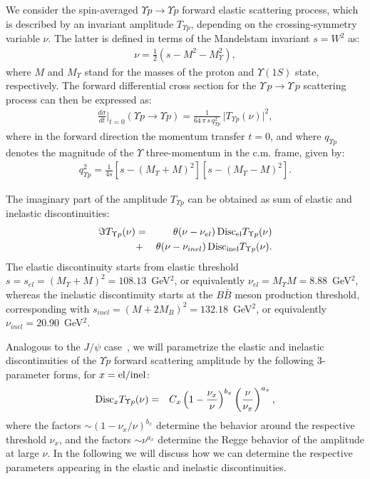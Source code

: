 \documentclass[prd,amsmath,%
twocolumn,floatfix,amssymb, preprintnumbers, linenumbers,nofootinbib, superscriptaddress]{revtex4}
\newcommand{\bea}{\begin{eqnarray}}
\newcommand{\eea}{\end{eqnarray}}
\begin{document}
We consider the spin-averaged $\Upsilon p \to \Upsilon p$ forward elastic scattering process, which is described by an invariant amplitude $T_{\Upsilon p}$, depending on the crossing-symmetry variable $\nu$. The latter is defined in terms of the Mandelstam invariant $s =W^2$ as:
\bea
\nu = \frac{1}{2} (s - M^2 - M_\Upsilon^2),
\eea
where $M$ and $M_\Upsilon$ stand for the masses of the proton and $\Upsilon(1S)$ state, respectively.  
The forward differential cross section for the $\Upsilon \, p \to \Upsilon \, p$ scattering process can then be expressed as:
\bea
\frac{d \sigma}{dt} \biggr|_{t = 0} (\Upsilon p \to \Upsilon p) = \frac{1}{64 \, \pi \, s \, q_{\Upsilon p}^2} \, \big| T_{\Upsilon p}(\nu) \big|^2,
\eea
where in the forward direction the momentum transfer $t = 0$, and where $q_{\Upsilon p}$ denotes the magnitude of the $\Upsilon$ three-momentum in the c.m. frame, given by:
 \bea 
 q_{\Upsilon p}^2  = \frac{1}{4 s} \left[ s - (M_\Upsilon + M)^2 \right] \left[ s - (M_\Upsilon - M)^2 \right].
 \eea 
 
The imaginary part of the amplitude $T_{\Upsilon p}$ can be obtained as sum of elastic and inelastic discontinuities:
\bea
\Im T_{\Upsilon p}(\nu)  &=& \theta(\nu - \nu_{el}) \,  {\rm Disc}_{\rm el} T_{\Upsilon p}(\nu) \nonumber \\
&+&   \theta(\nu - \nu_{inel}) \,  {\rm Disc}_{\rm inel} T_{\Upsilon p}(\nu).
\label{eq:disctot}
\eea
The elastic discontinuity starts from elastic threshold $s = s_{el} = (M_\Upsilon + M)^2 = 108.13$~GeV$^2$, or equivalently $\nu_{el} = M_\Upsilon M = 8.88$~GeV$^2$, whereas the inelastic discontinuity starts at the $B \bar B$ meson production threshold, corresponding with $s_{inel} = (M + 2 M_B)^2 = 132.18$~GeV$^2$, or equivalently $\nu_{inel} = 20.90$~GeV$^2$. 

Analogous to the $J/\psi$ case~\cite{Gryniuk:2016mpk}, we will parametrize the elastic and inelastic discontinuities of the $\Upsilon p$  forward scattering amplitude by the following 3-parameter forms, for $x = {\rm el/inel}$:
\bea
{\rm Disc}_{x} T_{\Upsilon p}(\nu)  &=& 
C_{x} \left( 1 - \frac{\nu_{x}}{\nu} \right)^{b_{x}}  \left( \frac{\nu}{\nu_{x}} \right)^{a_{x}} ,
\label{eq:discx} 
\eea
where the factors $\sim (1 - \nu_x / \nu)^{b_x}$  
determine the behavior around the respective threshold $\nu_x$, and the 
factors  $\sim \nu^{a_x}$ determine the Regge behavior of the amplitude at large $\nu$. 
In the following we will discuss how we can determine the respective parameters 
appearing in the elastic and inelastic discontinuities. 
\end{document}

